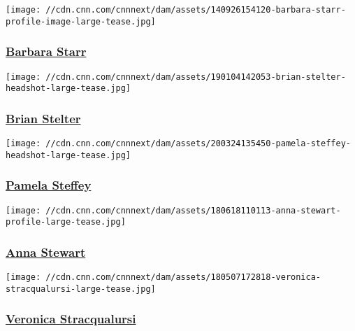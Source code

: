 \href{/profiles/barbara-starr-profile}{}

\texttt{[image: //cdn.cnn.com/cnnnext/dam/assets/140926154120-barbara-starr-profile-image-large-tease.jpg]}

\hypertarget{barbara-starr}{%
\subsubsection{\texorpdfstring{\href{/profiles/barbara-starr-profile}{Barbara
Starr}}{Barbara Starr}}\label{barbara-starr}}

\href{/profiles/brian-stelter-profile}{}

\texttt{[image: //cdn.cnn.com/cnnnext/dam/assets/190104142053-brian-stelter-headshot-large-tease.jpg]}

\hypertarget{brian-stelter}{%
\subsubsection{\texorpdfstring{\href{/profiles/brian-stelter-profile}{Brian
Stelter}}{Brian Stelter}}\label{brian-stelter}}

\href{/profiles/pamela-steffey-profile}{}

\texttt{[image: //cdn.cnn.com/cnnnext/dam/assets/200324135450-pamela-steffey-headshot-large-tease.jpg]}

\hypertarget{pamela-steffey}{%
\subsubsection{\texorpdfstring{\href{/profiles/pamela-steffey-profile}{Pamela
Steffey}}{Pamela Steffey}}\label{pamela-steffey}}

\href{/profiles/anna-stewart}{}

\texttt{[image: //cdn.cnn.com/cnnnext/dam/assets/180618110113-anna-stewart-profile-large-tease.jpg]}

\hypertarget{anna-stewart-}{%
\subsubsection{\texorpdfstring{\href{/profiles/anna-stewart}{Anna
Stewart }}{Anna Stewart }}\label{anna-stewart-}}

\href{/profiles/veronica-stracqualursi}{}

\texttt{[image: //cdn.cnn.com/cnnnext/dam/assets/180507172818-veronica-stracqualursi-large-tease.jpg]}

\hypertarget{veronica-stracqualursi-}{%
\subsubsection{\texorpdfstring{\href{/profiles/veronica-stracqualursi}{Veronica
Stracqualursi
}}{Veronica Stracqualursi }}\label{veronica-stracqualursi-}}


